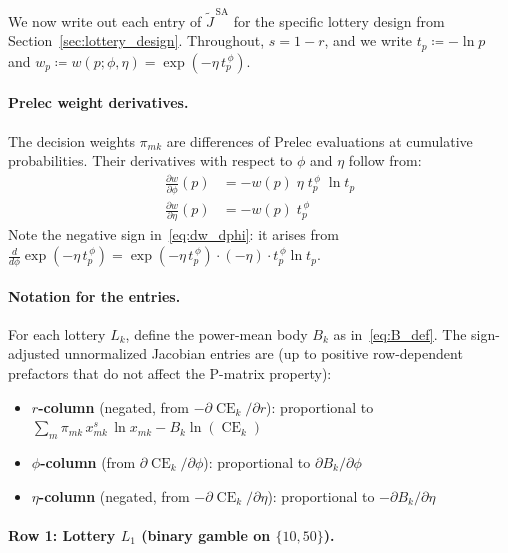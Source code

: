 \documentclass[11pt,a4paper]{article}
\theoremstyle{definition}
\DeclareMathOperator{\CE}{CE}
\begin{document}
We now write out each entry of $\widetilde{J}^{\,\mathrm{SA}}$ for the
specific lottery design from Section~\ref{sec:lottery_design}.
Throughout, $s = 1 - r$, and we write
$t_p \coloneqq -\ln p$ and $w_p \coloneqq w(p;\phi,\eta) =
\exp(-\eta\, t_p^{\,\phi})$.

\paragraph{Prelec weight derivatives.}
The decision weights $\pi_{mk}$ are differences of Prelec
evaluations at cumulative probabilities. Their derivatives with
respect to $\phi$ and $\eta$ follow from:
\begin{align}
    \label{eq:dw_dphi}
    \frac{\partial w}{\partial \phi}(p)
    &= -w(p)\;\eta\; t_p^{\,\phi}\;\ln t_p \\[4pt]
    \label{eq:dw_deta}
    \frac{\partial w}{\partial \eta}(p)
    &= -w(p)\; t_p^{\,\phi}
\end{align}
Note the negative sign in~\eqref{eq:dw_dphi}: it arises from
$\frac{d}{d\phi}\exp(-\eta\, t_p^{\,\phi})
= \exp(-\eta\, t_p^{\,\phi}) \cdot (-\eta)\cdot t_p^{\,\phi}\ln t_p$.

\paragraph{Notation for the entries.}
For each lottery $L_k$, define the power-mean body $B_k$ as
in~\eqref{eq:B_def}. The sign-adjusted unnormalized Jacobian entries
are (up to positive row-dependent prefactors that do not affect the
P-matrix property):
\begin{itemize}
    \item \textbf{$r$-column} (negated, from $-\partial\CE_k/\partial r$):
    proportional to $\sum_m \pi_{mk}\,x_{mk}^s\,\ln x_{mk} - B_k\ln(\CE_k)$

    \item \textbf{$\phi$-column} (from $\partial\CE_k/\partial\phi$):
    proportional to $\partial B_k / \partial\phi$

    \item \textbf{$\eta$-column} (negated, from $-\partial\CE_k/\partial\eta$):
    proportional to $-\partial B_k / \partial\eta$
\end{itemize}

\paragraph{Row 1: Lottery $L_1$ (binary gamble on $\{10, 50\}$).}
\end{document}
